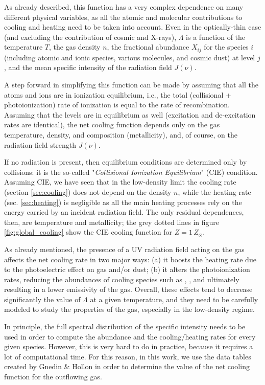 As already described, this function has a very complex dependence on many different physical variables, as all the atomic and molecular contributions to cooling and heating need to be taken into account. Even in the optically-thin case (and excluding the contribution of cosmic and X-rays), $\Lambda$ is a function of the temperature $T$, the gas density $n$, the fractional abundance $X_{ij}$ for the species $i$ (including atomic and ionic species, various molecules, and cosmic dust) at level $j$, and the mean specific intensity of the radiation field $J(\nu)$. 

A step forward in simplifying this function can be made by assuming that all the atoms and ions are in ionization equilibrium, i.e., the total (collisional + photoionization) rate of ionization is equal to the rate of recombination. Assuming that the levels are in equilibrium as well (excitation and de-excitation rates are identical), the net cooling function depends only on the gas temperature, density, and composition (metallicity), and, of course, on the radiation field strength $J(\nu)$. 

If no radiation is present, then equilibrium conditions are determined only by collisions: it is the so-called "\textit{Collisional Ionization Equilibrium}" (CIE) condition. Assuming CIE, we have seen that in the low-density limit the cooling rate (section \ref{sec:cooling}) does not depend on the density $n$, while the heating rate (sec. \ref{sec:heating}) is negligible as all the main heating processes rely on the energy carried by an incident radiation field. The only residual dependences, then, are temperature and metallicity; the grey dotted lines in figure \ref{fig:global_cooling} show the CIE cooling function for $Z=1\,Z_\odot$. 

As already mentioned, the presence of a UV radiation field acting on the gas affects the net cooling rate in two major ways: (a) it boosts the heating rate due to the photoelectric effect on gas and/or dust; (b) it alters the photoionization rates, reducing the abundances of cooling species such as \HI, \HeI, \CII and ultimately resulting in a lower emissivity of the gas. Overall, these effects tend to decrease significantly the value of $\Lambda$ at a given temperature, and they need to be carefully modeled to study the properties of the gas, especially in the low-density regime. 

In principle, the full spectral distribution of the specific intensity needs to be used in order to compute the abundance and the cooling/heating rates for every given species. However, this is very hard to do in practice, because it requires a lot of computational time. For this reason, in this work, we use the data tables created by Gnedin \& Hollon \citep{gnedin2012cooling} in order to determine the value of the net cooling function for the outflowing gas. 

